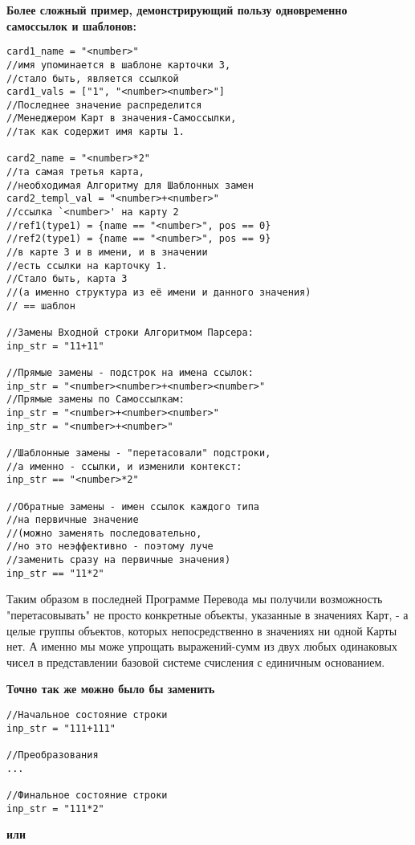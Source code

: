 \documentclass{book}
\begin{document}
\textbf{Более сложный пример, демонстрирующий пользу одновременно самоссылок и шаблонов:}

\begin{verbatim}
card1_name = "<number>"
//имя упоминается в шаблоне карточки 3, 
//стало быть, является ссылкой
card1_vals = ["1", "<number><number>"]
//Последнее значение распределится 
//Менеджером Карт в значения-Самоссылки,
//так как содержит имя карты 1.

card2_name = "<number>*2"
//та самая третья карта, 
//необходимая Алгоритму для Шаблонных замен
card2_templ_val = "<number>+<number>"
//ссылка `<number>' на карту 2
//ref1(type1) = {name == "<number>", pos == 0}
//ref2(type1) = {name == "<number>", pos == 9}
//в карте 3 и в имени, и в значении 
//есть ссылки на карточку 1. 
//Стало быть, карта 3 
//(а именно структура из её имени и данного значения)
// == шаблон

//Замены Входной строки Алгоритмом Парсера:
inp_str = "11+11"

//Прямые замены - подстрок на имена ссылок:
inp_str = "<number><number>+<number><number>"
//Прямые замены по Самоссылкам:
inp_str = "<number>+<number><number>"
inp_str = "<number>+<number>"

//Шаблонные замены - "перетасовали" подстроки, 
//а именно - ссылки, и изменили контекст:
inp_str == "<number>*2"

//Обратные замены - имен ссылок каждого типа
//на первичные значение
//(можно заменять последовательно, 
//но это неэффективно - поэтому луче
//заменить сразу на первичные значения)
inp_str == "11*2"
\end{verbatim}

Таким образом в последней Программе Перевода мы получили возможность "перетасовывать" не просто конкретные объекты, указанные в значениях Карт, - а целые группы объектов, которых непосредственно в значениях ни одной Карты нет. А именно мы може упрощать выражений-сумм из двух любых одинаковых чисел в представлении базовой системе счисления с единичным основанием. 

\textbf{Точно так же можно было бы заменить} 

\begin{verbatim}
//Начальное состояние строки
inp_str = "111+111"

//Преобразования
...

//Финальное состояние строки
inp_str = "111*2"
\end{verbatim}

\textbf{или}
\end{document}
